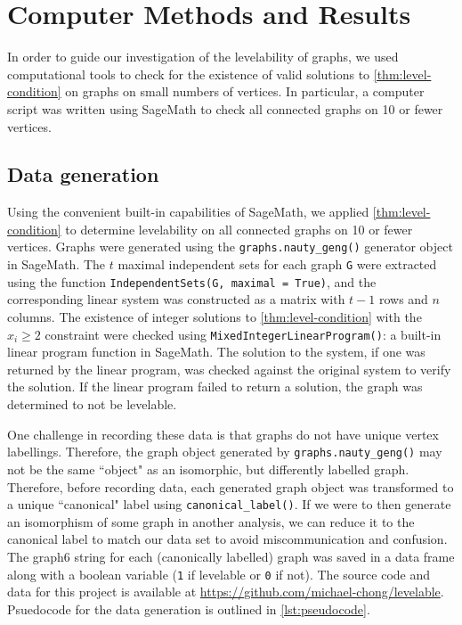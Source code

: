 \chapter{Computer Methods and Results}
\label{ch:computer-results}

In order to guide our investigation of the levelability of graphs, we used computational tools to check for the existence of valid solutions to \autoref{thm:level-condition} on graphs on small numbers of vertices. In particular, a computer script was written using SageMath to check all connected graphs on 10 or fewer vertices.

\section{Data generation}
Using the convenient built-in capabilities of SageMath, we applied \autoref{thm:level-condition} to determine levelability on all connected graphs on 10 or fewer vertices. Graphs were generated using the \texttt{graphs.nauty\_geng()} generator object in SageMath. The $t$ maximal independent sets for each graph \texttt{G} were extracted using the function \texttt{IndependentSets(G, maximal = True)}, and the corresponding linear system was constructed as a matrix with $t-1$ rows and $n$ columns. The existence of integer solutions to \autoref{thm:level-condition} with the $x_i \geq 2$ constraint were checked using \texttt{MixedIntegerLinearProgram()}: a built-in linear program function in SageMath. The solution to the system, if one was returned by the linear program, was checked against the original system to verify the solution. If the linear program failed to return a solution, the graph was determined to not be levelable. 

One challenge in recording these data is that graphs do not have unique vertex labellings. Therefore, the graph object generated by \texttt{graphs.nauty\_geng()} may not be the same ``object" as an isomorphic, but differently labelled graph. Therefore, before recording data, each generated graph object was transformed to a unique ``canonical" label using \texttt{canonical\_label()}. If we were to then generate an isomorphism of some graph in another analysis, we can reduce it to the canonical label to match our data set to avoid miscommunication and confusion. The graph6 string for each (canonically labelled) graph was saved in a data frame along with a boolean variable (\texttt{1} if levelable or \texttt{0} if not). The source code and data for this project is available at \url{https://github.com/michael-chong/levelable}. Psuedocode for the data generation is outlined in  \autoref{lst:pseudocode}.

